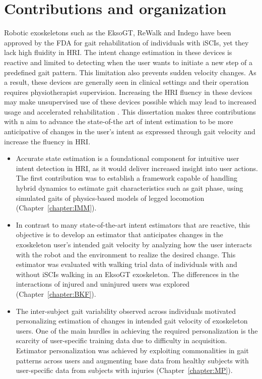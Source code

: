 \section{Contributions and organization}

Robotic exoskeletons such as the EksoGT, ReWalk and Indego have been approved by the FDA for gait rehabilitation of individuals with iSCIs, yet they lack high fluidity in HRI. The intent change estimation in these devices is reactive and limited to detecting when the user wants to initiate a new step of a predefined gait pattern. This limitation also prevents sudden velocity changes. As a result, these devices are generally seen in clinical settings and their operation requires physiotherapist supervision. Increasing the HRI fluency in these devices may make unsupervised use of these devices possible which may lead to increased usage and accelerated rehabilitation \cite{hidler2011role}. This dissertation makes three contributions with n aim to advance the state-of-the art of intent estimation to be more anticipative of changes in the user's intent as expressed through gait velocity and increase the fluency in HRI.

\begin{itemize}
	\item Accurate state estimation is a foundational component for intuitive user intent detection in HRI, as it would deliver increased insight into user actions. The first contribution was to establish a framework capable of handling hybrid dynamics to estimate gait characteristics such as gait phase, using simulated gaits of physics-based models of legged locomotion (Chapter~\ref{chapter:IMM}).
	\item In contrast to many state-of-the-art intent estimators that are reactive, this objective is to develop an estimator that anticipates changes in the exoskeleton user’s intended gait velocity by analyzing how the user interacts with the robot and the environment to realize the desired change. This estimator was evaluated with walking trial data of	individuals with and without iSCIs walking in an EksoGT exoskeleton. The differences in the interactions of injured and uninjured users was explored (Chapter~\ref{chapter:BKF}).
	\item The inter-subject gait variability observed across individuals motivated personalizing estimation of changes in intended gait velocity of exoskeleton users. One of the main hurdles in achieving the required personalization is the scarcity of user-specific training data due to difficulty in acquisition. Estimator personalization was achieved by exploiting commonalities in gait patterns across users and augmenting base data from healthy subjects with user-specific data from subjects with injuries (Chapter~\ref{chapter:MP}).
\end{itemize}